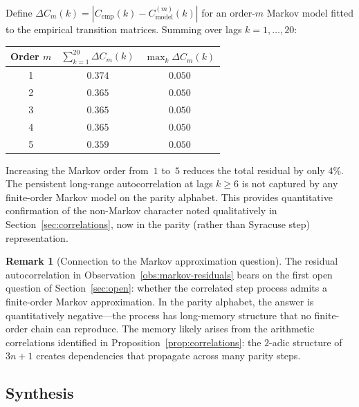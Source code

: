 \documentclass[11pt,a4paper]{article}
\theoremstyle{plain}
\theoremstyle{definition}
\newtheorem{remark}[theorem]{Remark}
\begin{document}
\begin{empirical}\label{obs:markov-residuals}
    Define $\Delta C_m(k) = |C_{\mathrm{emp}}(k) -
    C_{\mathrm{model}}^{(m)}(k)|$ for an order-$m$ Markov model
    fitted to the empirical transition matrices.  Summing over
    lags $k = 1, \ldots, 20$:
    \begin{center}
    \renewcommand{\arraystretch}{1.15}
    \begin{tabular}{ccc}
        \toprule
        Order $m$
            & $\displaystyle\sum_{k=1}^{20} \Delta C_m(k)$
            & $\max_k \Delta C_m(k)$ \\
        \midrule
        1 & $0.374$ & $0.050$ \\
        2 & $0.365$ & $0.050$ \\
        3 & $0.365$ & $0.050$ \\
        4 & $0.365$ & $0.050$ \\
        5 & $0.359$ & $0.050$ \\
        \bottomrule
    \end{tabular}
    \end{center}
    Increasing the Markov order from~$1$ to~$5$ reduces the total
    residual by only $4\%$.  The persistent long-range
    autocorrelation at lags $k \geq 6$ is not captured by any
    finite-order Markov model on the parity alphabet.  This provides
    quantitative confirmation of the non-Markov character noted
    qualitatively in Section~\ref{sec:correlations}, now in the
    parity (rather than Syracuse step) representation.
\end{empirical}

\begin{remark}[Connection to the Markov approximation question]
    The residual autocorrelation in
    Observation~\ref{obs:markov-residuals} bears on the first open
    question of Section~\ref{sec:open}: whether the correlated step
    process admits a finite-order Markov approximation.  In the
    parity alphabet, the answer is quantitatively negative---the
    process has long-memory structure that no finite-order chain can
    reproduce.  The memory likely arises from the arithmetic
    correlations identified in
    Proposition~\ref{prop:correlations}: the $2$-adic structure of
    $3n+1$ creates dependencies that propagate across many parity
    steps.
\end{remark}

\subsection{Synthesis}
\end{document}
